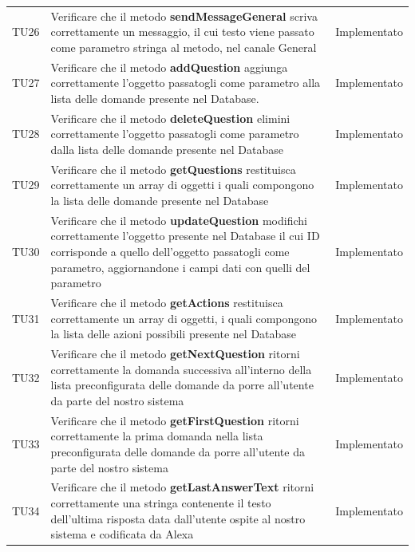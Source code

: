 \documentclass[../PianoDiQualifica_v4.0.0.tex]{subfiles}
\begin{document}
\begin{longtable}[c] { >{\centering\arraybackslash}p{2cm} p{9cm} >{\centering\arraybackslash}p{4cm}}
			\addlinespace[0.3em]
			\midrule
			\addlinespace[0.3em]
			TU26 & Verificare che il metodo \textbf{sendMessageGeneral} scriva correttamente un messaggio, il cui testo viene passato come parametro stringa al metodo, nel canale General & Implementato \\
			\addlinespace[0.3em]
			\midrule
			\addlinespace[0.3em]
			TU27 & Verificare che il metodo \textbf{addQuestion} aggiunga correttamente l'oggetto passatogli come parametro alla lista delle domande presente nel Database. & Implementato \\
			\addlinespace[0.3em]
			\midrule
			\addlinespace[0.3em]
			TU28 & Verificare che il metodo \textbf{deleteQuestion} elimini correttamente l'oggetto passatogli come parametro dalla lista delle domande presente nel Database & Implementato \\
			\addlinespace[0.3em]
			\midrule
			\addlinespace[0.3em]
			TU29 & Verificare che il metodo \textbf{getQuestions} restituisca correttamente un array di oggetti i quali compongono la lista delle domande presente nel Database & Implementato \\
			\addlinespace[0.3em]
			\midrule
			\addlinespace[0.3em]
			TU30 & Verificare che il metodo \textbf{updateQuestion} modifichi correttamente l'oggetto presente nel Database il cui ID corrisponde a quello dell'oggetto passatogli come parametro, aggiornandone i campi dati con quelli del parametro & Implementato \\
			\addlinespace[0.3em]
			\midrule
			\addlinespace[0.3em]
			TU31 & Verificare che il metodo \textbf{getActions} restituisca correttamente un array di oggetti, i quali compongono la lista delle azioni possibili presente nel Database & Implementato \\
			\addlinespace[0.3em]
			\midrule
			\addlinespace[0.3em]
			TU32 & Verificare che il metodo \textbf{getNextQuestion} ritorni correttamente la domanda successiva all'interno della lista preconfigurata delle domande da porre all'utente da parte del nostro sistema & Implementato \\
			\addlinespace[0.3em]
			\midrule
			\addlinespace[0.3em]
			TU33 & Verificare che il metodo \textbf{getFirstQuestion} ritorni correttamente la prima domanda nella lista preconfigurata delle domande da porre all'utente da parte del nostro sistema & Implementato \\
			\addlinespace[0.3em]
			\midrule
			\addlinespace[0.3em]
			TU34 & Verificare che il metodo \textbf{getLastAnswerText} ritorni correttamente una stringa contenente il testo dell'ultima risposta data dall'utente ospite al nostro sistema e codificata da Alexa & Implementato \\

\end{longtable}
\end{document}
